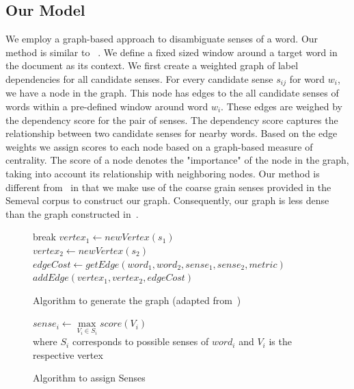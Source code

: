\documentclass[12pt,letterpaper]{article}
\newcommand{\blue}[1]{\textcolor{RoyalBlue}{#1}}
\newcommand{\instructions}[1]{\blue{\textit{#1}}}
\begin{document}
\subsection{Our Model}
\label{sec:proposed-models}
We employ a graph-based approach to disambiguate senses of a word. Our method is similar to ~\cite{Sinha}. We define a fixed sized window around a target word in the document as its context. We first create a weighted graph of label dependencies for all candidate senses. For every candidate sense $s_{ij}$ for word $w_i$, we have a node in the graph. This node has edges to the all candidate senses of words within a pre-defined window around word $w_i$. These edges are weighed by the dependency score for the pair of senses. The dependency score captures the relationship between two candidate senses for nearby words. Based on the edge weights we assign scores to each node based on a graph-based measure of centrality. The score of a node denotes the "importance" of the node in the graph, taking into account its relationship with neighboring nodes.
Our method is different from~\cite{Sinha} in that we make use of the coarse grain senses provided in the Semeval corpus to construct our graph. Consequently, our graph is less dense than the graph constructed in~\cite{Sinha}.
\begin{figure}
\begin{algorithm}[H]
{
	{
		{
			break
		}
		\Else
		{
			{
				{
					$vertex_1 \gets newVertex(s_1)$ \\
					$vertex_2 \gets newVertex(s_2)$ \\
					$edgeCost \gets getEdge(word_1,word_2,sense_1,sense_2,metric)$ 
					$addEdge(vertex_1,vertex_2,edgeCost)$
				}	
			}
		}
	}
}
\caption{Algorithm to generate the graph (adapted from~\cite{Sinha})}
\end{algorithm}
\begin{algorithm}[H]
{
	$sense_i\gets \max\limits_{V_i \in S_i} score(V_i)$ \\
	where $S_i$ corresponds to possible senses of $word_i$ and $V_i$ is the respective vertex
}
\caption{Algorithm to assign Senses}
\end{algorithm}

\end{figure}
\end{document}
